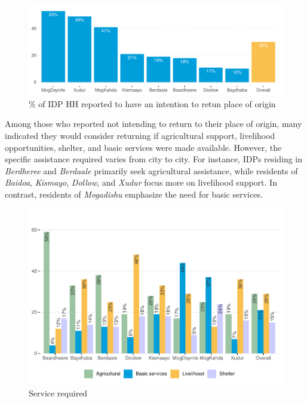\documentclass[
]{article}
\begin{document}
\begin{figure}[H]

{\centering \includegraphics[width=0.8\linewidth,height=0.8\textheight]{climate_vs_conflict_files/figure-latex/unnamed-chunk-3-1} 

}

\caption{\% of IDP HH reported to have an intention to retun place of origin}\label{fig:unnamed-chunk-3}
\end{figure}

Among those who reported not intending to return to their place of
origin, many indicated they would consider returning if agricultural
support, livelihood opportunities, shelter, and basic services were made
available. However, the specific assistance required varies from city to
city. For instance, IDPs residing in \emph{Berdheree} and
\emph{Berdaale} primarily seek agricultural assistance, while residents
of \emph{Baidoa}, \emph{Kismayo}, \emph{Dollow}, and \emph{Xudur} focus
more on livelihood support. In contrast, residents of \emph{Mogadishu}
emphasize the need for basic services.

\begin{figure}[H]

{\centering \includegraphics[width=0.8\linewidth,height=0.8\textheight]{climate_vs_conflict_files/figure-latex/unnamed-chunk-4-1} 

}

\caption{Service required}\label{fig:unnamed-chunk-4}
\end{figure}
\end{document}
